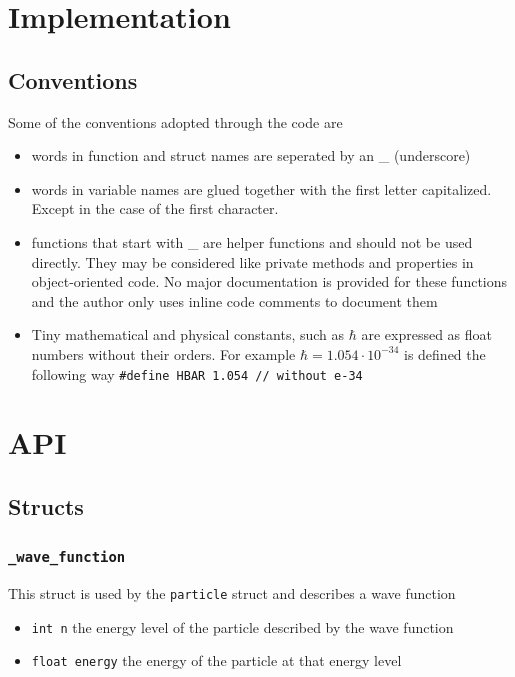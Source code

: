 \documentclass[a4paper, 10pt]{article}
\begin{document}
\newpage

\section{Implementation}
    \subsection{Conventions}
    Some of the conventions adopted through the code are
    \begin{itemize}
        \item words in function and struct names are seperated by an \_ (underscore)
        \item words in variable names are glued together with the first letter
              capitalized. Except in the case of the first character.
        \item functions that start with \_ are helper functions
              and should not be used directly. They may be considered like private
              methods and properties in object-oriented code. No major documentation
              is provided for these functions and the author only uses inline code
              comments to document them
        \item Tiny mathematical and physical constants, such as $\hbar$ are expressed
              as float numbers without their orders. For example $\hbar = 1.054\cdot10^{-34}$
              is defined the following way \texttt{\#define HBAR 1.054 // without e-34}
    \end{itemize}


\newpage
\section{API}
    \subsection{Structs}
        \subsubsection{\texttt{\_wave\_function}}
        This struct is used by the \texttt{particle} struct and describes a wave function
        \begin{itemize}
            \item \texttt{int n} the energy level of the particle described by the wave function
            \item \texttt{float energy} the energy of the particle at that energy level
        \end{itemize}
\end{document}
